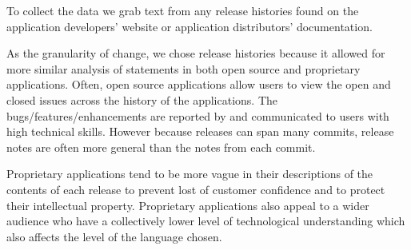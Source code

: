 \documentclass{acm_proc_article-sp}
\begin{document}
To collect the data we grab text from any release histories found on the application developers' website or application distributors' documentation. 

As the granularity of change, we chose release histories because it allowed for more similar analysis of statements in both open source and proprietary applications. 
Often, open source applications allow users to view the open and closed issues across the history of the applications. 
The bugs/features/enhancements are reported by and communicated to users with high technical skills. 
However because releases can span many commits, release notes are often more general than the notes from each commit.

Proprietary applications tend to be more vague in their descriptions of the contents of each release to prevent lost of customer confidence and to protect their intellectual property. 
Proprietary applications also appeal to a wider audience who have a collectively lower level of technological understanding which also affects the level of the language chosen.
\end{document}
